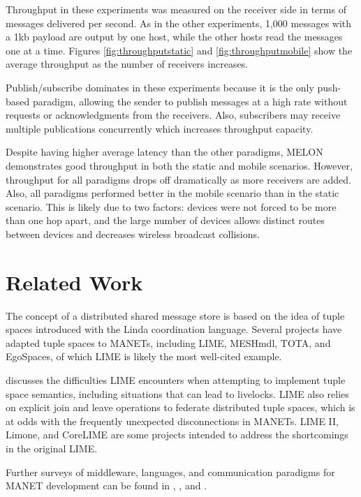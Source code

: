 \documentclass[lnicst]{svmultln}
\begin{document}
Throughput in these experiments was measured on the receiver side in terms of messages delivered per second. As in the other experiments, 1,000 messages with a 1kb payload are output by one host, while the other hosts read the messages one at a time. Figures \ref{fig:throughputstatic} and \ref{fig:throughputmobile} show the average throughput as the number of receivers increases.

Publish/subscribe dominates in these experiments because it is the only push-based paradigm, allowing the sender to publish messages at a high rate without requests or acknowledgments from the receivers. Also, subscribers may receive multiple publications concurrently which increases throughput capacity.

Despite having higher average latency than the other paradigms, MELON demonstrates good throughput in both the static and mobile scenarios. However, throughput for all paradigms drops off dramatically as more receivers are added. Also, all paradigms performed better in the mobile scenario than in the static scenario. This is likely due to two factors: devices were not forced to be more than one hop apart, and the large number of devices allows distinct routes between devices and decreases wireless broadcast collisions.

\section{Related Work}

The concept of a distributed shared message store is based on the idea of tuple spaces introduced with the Linda\cite{linda} coordination language. Several projects have adapted tuple spaces to MANETs, including LIME\cite{lime}, MESHmdl\cite{meshmdl}, TOTA\cite{tota}, and EgoSpaces, of which LIME is likely the most well-cited example.

\cite{limerevisted} discusses the difficulties LIME encounters when attempting to implement tuple space semantics, including situations that can lead to livelocks. LIME also relies on explicit join and leave operations to federate distributed tuple spaces, which is at odds with the frequently unexpected disconnections in MANETs. LIME II, Limone, and CoreLIME are some projects intended to address the shortcomings in the original LIME.

Further surveys of middleware, languages, and communication paradigms for MANET development can be found in \cite{mine}, \cite{collins2012quantitative}, and \cite{mwtrends}.
\end{document}
